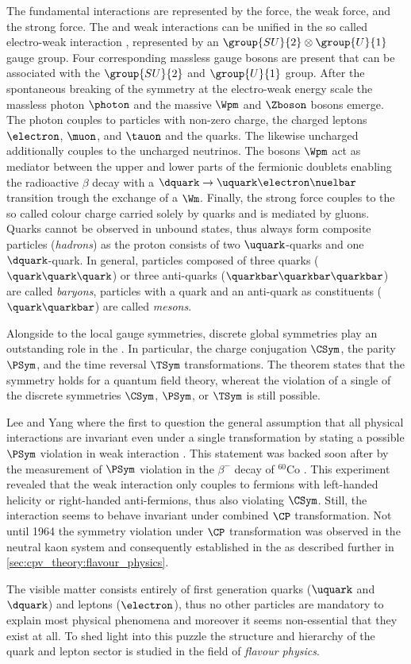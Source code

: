 The fundamental interactions are represented by the \EM force, the weak force,
and the strong force. The \EM and weak interactions can be unified in the so
called electro-weak interaction \cite{set:gws}, represented by an
$\group{SU}{2}\otimes\group{U}{1}$ gauge group. Four corresponding massless
gauge bosons are present that can be associated with the $\group{SU}{2}$ and
$\group{U}{1}$ group. After the spontaneous breaking of the symmetry at the
electro-weak energy scale the massless photon $\photon$ and the massive $\Wpm$
and $\Zboson$ bosons emerge. The photon couples to particles with non-zero \EM
charge, \ie the charged leptons $\electron$, $\muon$, and $\tauon$ and the
quarks. The likewise uncharged \Zboson additionally couples to the uncharged
neutrinos. The bosons $\Wpm$ act as mediator between the upper and lower parts
of the fermionic doublets enabling \eg the radioactive $\beta$ decay with a
$\dquark\to\uquark\electron\nuelbar$ transition trough the exchange of a $\Wm$.
Finally, the strong force couples to the so called colour charge carried solely
by quarks and is mediated by gluons. Quarks cannot be observed in unbound
states, thus always form composite particles (\emph{hadrons}) as \eg the proton
consists of two $\uquark$-quarks and one $\dquark$-quark. In general, particles
composed of three quarks ($\quark\quark\quark$) or three anti-quarks
($\quarkbar\quarkbar\quarkbar$) are called \emph{baryons}, particles with a
quark and an anti-quark as constituents ($\quark\quarkbar$) are called
\emph{mesons}.

Alongside to the local gauge symmetries, discrete global symmetries play an
outstanding role in the \SM. In particular, the charge conjugation $\CSym$, the
parity $\PSym$, and the time reversal $\TSym$ transformations. The \CPT theorem
\cite{set:cpt} states that the \CPT symmetry holds for a quantum field theory,
whereat the violation of a single of the discrete symmetries $\CSym$, $\PSym$,
or $\TSym$ is still possible. 

Lee and Yang where the first to question the general assumption that all
physical interactions are invariant even under a single transformation by
stating a possible $\PSym$ violation in weak interaction \cite{Lee:1956qn}. This
statement was backed soon after by the measurement of $\PSym$ violation in the
$\beta^{-}$ decay of ${}^{60}\text{Co}$ \cite{Wu:1957my}. This experiment
revealed that the weak interaction only couples to fermions with left-handed
helicity or right-handed anti-fermions, thus also violating $\CSym$. Still, the
interaction seems to behave invariant under combined $\CP$ transformation. Not
until 1964 the symmetry violation under $\CP$ transformation was observed in the
neutral kaon system \cite{Christenson:1964fg} and consequently established in
the \SM as described further in \cref{sec:cpv_theory:flavour_physics}.


The visible matter consists entirely of first generation quarks ($\uquark$ and
$\dquark$) and leptons ($\electron$), thus no other particles are mandatory to
explain most physical phenomena and moreover it seems non-essential that they
exist at all. To shed light into this puzzle the structure and hierarchy of the
quark and lepton sector is studied in the field of \emph{flavour physics}.

